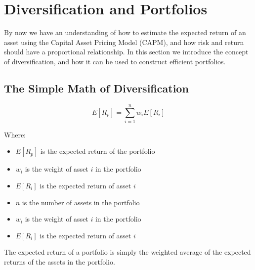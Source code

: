 \section{Diversification and Portfolios}
\label{sec:diversification_and_portfolios}

By now we have an understanding of how to estimate the expected return of an asset using the Capital Asset Pricing Model (CAPM), and 
how risk and return should have a proportional relationship. In this section we introduce the concept of diversification, and how it can be used to
construct efficient portfolios.

\subsection{The Simple Math of Diversification}

\begin{equation}
    \label{eq:portfolio_expected_return}
      E[R_p] = \sum_{i=1}^n w_i E[R_i]
\end{equation}

Where:
\begin{itemize}
    \item $E[R_p]$ is the expected return of the portfolio
    \item $w_i$ is the weight of asset $i$ in the portfolio
    \item $E[R_i]$ is the expected return of asset $i$
    \item $n$ is the number of assets in the portfolio
    \item $w_i$ is the weight of asset $i$ in the portfolio
    \item $E[R_i]$ is the expected return of asset $i$
\end{itemize}

The expected return of a portfolio is simply the weighted average of the expected returns of the assets in the portfolio.

